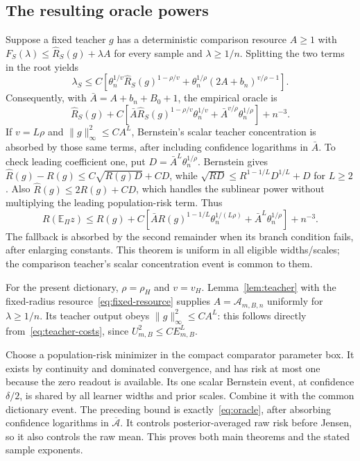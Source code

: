 \subsection{The resulting oracle powers}
Suppose a fixed teacher $g$ has a deterministic comparison resource
$A\ge1$ with
$F_S(\lambda)\le\widehat R_S(g)+\lambda A$ for every sample and
$\lambda\ge1/n$. Splitting the two terms in the root yields
\[
 \lambda_S\le C\left[
 \theta_n^{1/v}\widehat R_S(g)^{1-\rho/v}
 +\theta_n^{1/\rho}(2A+b_n)^{v/\rho-1}\right].
\]
Consequently, with $\bar A=A+b_n+B_0+1$, the empirical oracle is
\[
 \widehat R_S(g)+C\left[
 \bar A\widehat R_S(g)^{1-\rho/v}\theta_n^{1/v}
 +\bar A^{v/\rho}\theta_n^{1/\rho}\right]+n^{-3}.
\]
If $v=L\rho$ and $\|g\|_\infty^2\le C A^L$, Bernstein's scalar
teacher concentration is absorbed by those same terms, after including
confidence logarithms in $\bar A$. To check leading coefficient one,
put $D=\bar A^L\theta_n^{1/\rho}$. Bernstein gives
$\widehat R(g)-R(g)\le C\sqrt{R(g)D}+CD$, while
$\sqrt{RD}\le R^{1-1/L}D^{1/L}+D$ for $L\ge2$.
Also $\widehat R(g)\le2R(g)+CD$, which handles the sublinear power
without multiplying the leading population-risk term. Thus
\begin{equation}
 R(\mathbb E_\Pi z)\le R(g)+C\left[
 \bar A R(g)^{1-1/L}\theta_n^{1/(L\rho)}
 +\bar A^L\theta_n^{1/\rho}\right]+n^{-3}.
 \label{eq:localized-population-oracle}
\end{equation}
The fallback is absorbed by the second remainder when its branch
condition fails, after enlarging constants. This theorem is uniform in
all eligible widths/scales; the comparison teacher's scalar
concentration event is common to them.

For the present dictionary, $\rho=\rho_H$ and $v=v_H$. Lemma~\ref{lem:teacher} with the fixed-radius resource~\eqref{eq:fixed-resource} supplies $A=\mathcal A_{m,B,n}$ uniformly for $\lambda\ge1/n$. Its teacher output obeys $\|g\|_\infty^2\le C A^L$: this follows directly from~\eqref{eq:teacher-costs}, since $U_{m,B}^2\le C E_{m,B}^L$.

Choose a population-risk minimizer in the compact comparator parameter box. It exists by continuity and dominated convergence, and has risk at most one because the zero readout is available. Its one scalar Bernstein event, at confidence $\delta/2$, is shared by all learner widths and prior scales. Combine it with the common dictionary event. The preceding bound is exactly~\eqref{eq:oracle}, after absorbing confidence logarithms in $\overline{\mathcal A}$. It controls posterior-averaged raw risk before Jensen, so it also controls the raw mean. This proves both main theorems and the stated sample exponents.
